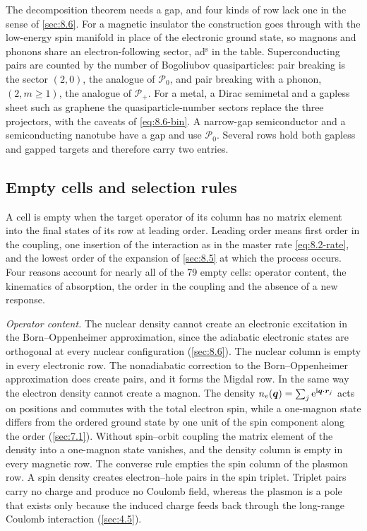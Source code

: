 The decomposition theorem needs a gap, and four kinds of row lack one in the sense of \cref{sec:8.6}. For a magnetic insulator the construction goes through with the low-energy spin manifold in place of the electronic ground state, so magnons and phonons share an electron-following sector, ad$^{\mathrm{s}}$ in the table. Superconducting pairs are counted by the number of Bogoliubov quasiparticles: pair breaking is the sector $(2,0)$, the analogue of $\mathcal{P}_0$, and pair breaking with a phonon, $(2, m \ge 1)$, the analogue of $\mathcal{P}_+$. For a metal, a Dirac semimetal and a gapless sheet such as graphene the quasiparticle-number sectors replace the three projectors, with the caveats of \cref{eq:8.6-bin}. A narrow-gap semiconductor and a semiconducting nanotube have a gap and use $\mathcal{P}_0$. Several rows hold both gapless and gapped targets and therefore carry two entries.

\subsection{Empty cells and selection rules}\label{sec:9.1-empty}

A cell is empty when the target operator of its column has no matrix element into the final states of its row at leading order. Leading order means first order in the coupling, one insertion of the interaction as in the master rate \cref{eq:8.2-rate}, and the lowest order of the expansion of \cref{sec:8.5} at which the process occurs. Four reasons account for nearly all of the 79 empty cells: operator content, the kinematics of absorption, the order in the coupling and the absence of a new response.

\emph{Operator content.} The nuclear density cannot create an electronic excitation in the Born--Oppenheimer approximation, since the adiabatic electronic states are orthogonal at every nuclear configuration (\cref{sec:8.6}). The nuclear column is empty in every electronic row. The nonadiabatic correction to the Born--Oppenheimer approximation does create pairs, and it forms the Migdal row. In the same way the electron density cannot create a magnon. The density $n_e(\bm{q}) = \sum_j\mathrm{e}^{\mathrm{i}\bm{q}\cdot\bm{r}_j}$ acts on positions and commutes with the total electron spin, while a one-magnon state differs from the ordered ground state by one unit of the spin component along the order (\cref{sec:7.1}). Without spin--orbit coupling the matrix element of the density into a one-magnon state vanishes, and the density column is empty in every magnetic row. The converse rule empties the spin column of the plasmon row. A spin density creates electron--hole pairs in the spin triplet. Triplet pairs carry no charge and produce no Coulomb field, whereas the plasmon is a pole that exists only because the induced charge feeds back through the long-range Coulomb interaction (\cref{sec:4.5}).

